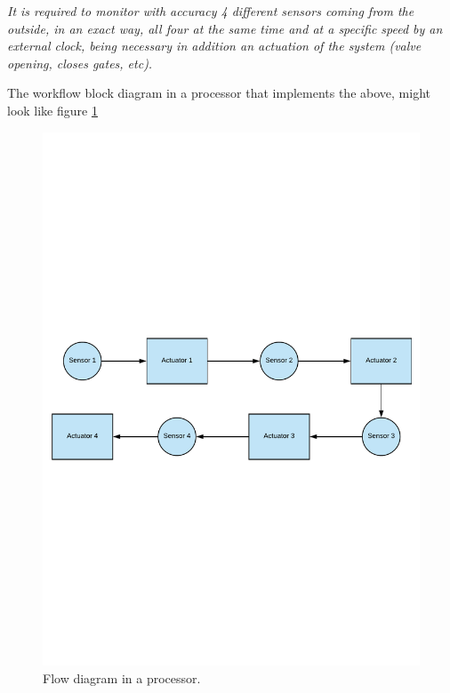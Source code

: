 \textsl{It is required to monitor with accuracy 4 different sensors coming from the outside, in an exact way, all four at the same time and at a specific speed by an external clock, being necessary in addition an actuation of the system (valve opening, closes gates, etc).}\newline

The workflow block diagram in a processor that implements the above, might look like figure \ref{fig:processor_sensor}

\begin{center}
	\begin{figure}[H]
		\center
		\includegraphics[trim = 0mm 10cm 0mm 10cm, clip,scale=0.5]{imagenes/EstadoArte/processor_sensor.pdf}
		\caption{Flow diagram in a processor.}
		\label{fig:processor_sensor}
	\end{figure}
\end{center} 


